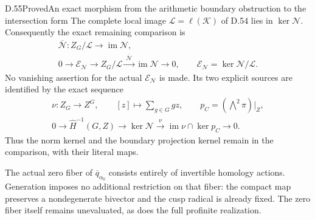\begin{statement}{D.55}{Proved}{An exact morphism from the arithmetic boundary obstruction to the intersection form}
The complete local image
\(\mathcal L=\ell(\mathcal K)\) of D.54
lies in \(\ker\mathcal N\).
Consequently the exact remaining comparison is
\[
 \begin{gathered}
 \overline{\mathcal N}:Z_G/\mathcal L
                \longrightarrow\operatorname{im}\mathcal N,\\
 0\longrightarrow
       \mathcal E_{\mathcal N}
       \longrightarrow Z_G/\mathcal L
       \xrightarrow{\ \overline{\mathcal N}\ }
                \operatorname{im}\mathcal N
       \longrightarrow0,\qquad
 \mathcal E_{\mathcal N}
       =\ker\mathcal N/\mathcal L .
 \end{gathered}
 \tag{D.55.4}
\]
No vanishing assertion for the actual
\(\mathcal E_{\mathcal N}\) is made.
Its two explicit sources are identified
by the exact sequence
\[
 \begin{gathered}
 \nu:Z_G\longrightarrow Z^G,\qquad
       [z]\longmapsto\sum_{g\in G}gz,\qquad
 p_C=(\bigwedge\nolimits^2\pi)|_Z,\\
 0\longrightarrow\widehat H^{-1}(G,Z)
       \longrightarrow\ker\mathcal N
       \xrightarrow{\ \nu\ }
          \operatorname{im}\nu\cap\ker p_C
       \longrightarrow0 .
 \end{gathered}
 \tag{D.55.5}
\]
Thus the norm kernel and the boundary
projection kernel remain in the
comparison, with their literal maps.

The actual zero fiber of
\(\overline q_{\alpha_0}\) consists
entirely of invertible homology actions.
Generation imposes no additional
restriction on that fiber: the compact
map preserves a nondegenerate bivector
and the cusp radical is already fixed.
The zero fiber itself remains
unevaluated, as does the full profinite
realization.


\end{statement}
